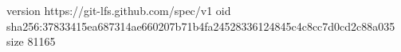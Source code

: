 version https://git-lfs.github.com/spec/v1
oid sha256:37833415ea687314ae660207b71b4fa24528336124845c4c8cc7d0cd2c88a035
size 81165
